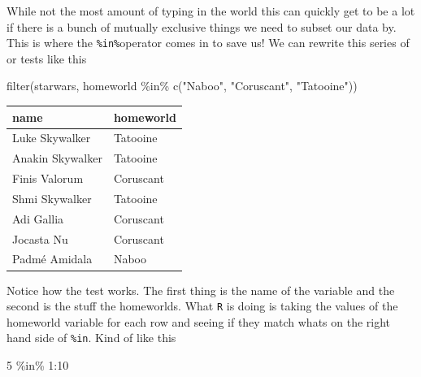 \documentclass[
  letterpaper,
  DIV=11,
  numbers=noendperiod,
  oneside]{scrreprt}
\newenvironment{Shaded}{\begin{snugshade}}{\end{snugshade}}
\newcommand{\DecValTok}[1]{\textcolor[rgb]{0.68,0.00,0.00}{#1}}
\newcommand{\FunctionTok}[1]{\textcolor[rgb]{0.28,0.35,0.67}{#1}}
\newcommand{\NormalTok}[1]{\textcolor[rgb]{0.00,0.23,0.31}{#1}}
\newcommand{\SpecialCharTok}[1]{\textcolor[rgb]{0.37,0.37,0.37}{#1}}
\newcommand{\StringTok}[1]{\textcolor[rgb]{0.13,0.47,0.30}{#1}}
\begin{document}
While not the most amount of typing in the world this can quickly get to
be a lot if there is a bunch of mutually exclusive things we need to
subset our data by. This is where the \texttt{\%in\%}operator comes in
to save us! We can rewrite this series of or tests like this

\begin{Shaded}
\begin{Highlighting}[]
\FunctionTok{filter}\NormalTok{(starwars, homeworld }\SpecialCharTok{\%in\%} \FunctionTok{c}\NormalTok{(}\StringTok{"Naboo"}\NormalTok{, }\StringTok{"Coruscant"}\NormalTok{, }\StringTok{"Tatooine"}\NormalTok{))}
\end{Highlighting}
\end{Shaded}

\begin{tabular}{l|l}
\hline
name & homeworld\\
\hline
Luke Skywalker & Tatooine\\
\hline
Anakin Skywalker & Tatooine\\
\hline
Finis Valorum & Coruscant\\
\hline
Shmi Skywalker & Tatooine\\
\hline
Adi Gallia & Coruscant\\
\hline
Jocasta Nu & Coruscant\\
\hline
Padmé Amidala & Naboo\\
\hline
\end{tabular}


Notice how the test works. The first thing is the name of the variable
and the second is the stuff the homeworlds. What \texttt{R} is doing is
taking the values of the homeworld variable for each row and seeing if
they match whats on the right hand side of \texttt{\%in}. Kind of like
this

\begin{Shaded}
\begin{Highlighting}[]
\DecValTok{5} \SpecialCharTok{\%in\%} \DecValTok{1}\SpecialCharTok{:}\DecValTok{10}
\end{Highlighting}
\end{Shaded}
\end{document}
